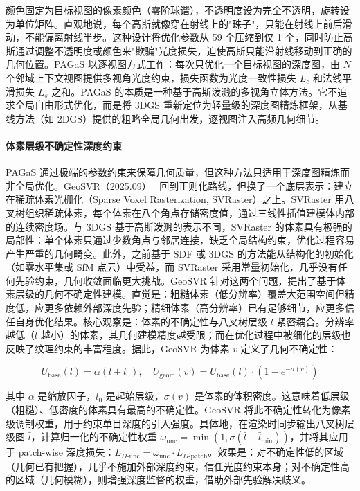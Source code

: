 颜色固定为目标视图的像素颜色（零阶球谐），不透明度设为完全不透明，旋转设为单位矩阵。直观地说，每个高斯就像穿在射线上的"珠子"，只能在射线上前后滑动，不能偏离射线半步。这种设计将优化参数从 59 个压缩到仅 1 个，同时防止高斯通过调整不透明度或颜色来"欺骗"光度损失，迫使高斯只能沿射线移动到正确的几何位置。PAGaS 以逐视图方式工作：每次只优化一个目标视图的深度图，由 $N$ 个邻域上下文视图提供多视角光度约束，损失函数为光度一致性损失 $L_c$ 和法线平滑损失 $L_s$ 之和。PAGaS 的本质是一种基于高斯泼溅的多视角立体方法。它不追求全局自由形式优化，而是将 3DGS 重新定位为轻量级的深度图精炼框架，从基线方法（如 2DGS）提供的粗略全局几何出发，逐视图注入高频几何细节。

\paragraph{体素层级不确定性深度约束}

PAGaS 通过极端的参数约束来保障几何质量，但这种方法只适用于深度图精炼而非全局优化。GeoSVR（2025.09）~\cite{2509_18090} 回到正则化路线，但换了一个底层表示：建立在稀疏体素光栅化（Sparse Voxel Rasterization, SVRaster）之上。SVRaster 用八叉树组织稀疏体素，每个体素在八个角点存储密度值，通过三线性插值建模体内部的连续密度场。与 3DGS 基于高斯泼溅的表示不同，SVRaster 的体素具有极强的局部性：单个体素只通过少数角点与邻居连接，缺乏全局结构约束，优化过程容易产生严重的几何畸变。此外，之前基于 SDF 或 3DGS 的方法能从结构化的初始化（如零水平集或 SfM 点云）中受益，而 SVRaster 采用常量初始化，几乎没有任何先验约束，几何收敛面临更大挑战。GeoSVR 针对这两个问题，提出了基于体素层级的几何不确定性建模。直觉是：粗糙体素（低分辨率）覆盖大范围空间但精度低，应更多依赖外部深度先验；精细体素（高分辨率）已有足够细节，应更多信任自身优化结果。核心观察是：体素的不确定性与八叉树层级 $l$ 紧密耦合。分辨率越低（$l$ 越小）的体素，其几何建模精度越受限；而在优化过程中被细化的层级也反映了纹理约束的丰富程度。据此，GeoSVR 为体素 $v$ 定义了几何不确定性：

\begin{equation}
    U_{\text{base}}(l) = \alpha(l + l_0), \quad U_{\text{geom}}(v) = U_{\text{base}}(l) \cdot (1 - e^{-\sigma(v)})
\end{equation}

其中 $\alpha$ 是缩放因子，$l_0$ 是起始层级，$\sigma(v)$ 是体素的体积密度。这意味着低层级（粗糙）、低密度的体素具有最高的不确定性。GeoSVR 将此不确定性转化为像素级调制权重，用于约束单目深度的引入强度。具体地，在渲染时同步输出八叉树层级图 $\bar{l}$，计算归一化的不确定性权重 $\omega_{\text{unc}} = \min(1, \sigma(\bar{l} - \bar{l}_{\min}))$，并将其应用于 patch-wise 深度损失：$L_{D\text{-unc}} = \omega_{\text{unc}} \cdot L_{D\text{-patch}}$。效果是：对不确定性低的区域（几何已有把握），几乎不施加外部深度约束，信任光度约束本身；对不确定性高的区域（几何模糊），则增强深度监督的权重，借助外部先验解决歧义。

